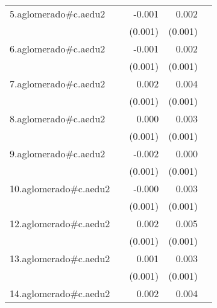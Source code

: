 {\begin{longtable}{l*{4}{D{.}{.}{-1}}}
\addlinespace
5.aglomerado#c.aedu2&                     &      -0.001         &       0.002\sym{**} &                     \\
            &                     &     (0.001)         &     (0.001)         &                     \\
\addlinespace
6.aglomerado#c.aedu2&                     &      -0.001         &       0.002\sym{*}  &                     \\
            &                     &     (0.001)         &     (0.001)         &                     \\
\addlinespace
7.aglomerado#c.aedu2&                     &       0.002         &       0.004\sym{***}&                     \\
            &                     &     (0.001)         &     (0.001)         &                     \\
\addlinespace
8.aglomerado#c.aedu2&                     &       0.000         &       0.003\sym{***}&                     \\
            &                     &     (0.001)         &     (0.001)         &                     \\
\addlinespace
9.aglomerado#c.aedu2&                     &      -0.002         &       0.000         &                     \\
            &                     &     (0.001)         &     (0.001)         &                     \\
\addlinespace
10.aglomerado#c.aedu2&                     &      -0.000         &       0.003\sym{**} &                     \\
            &                     &     (0.001)         &     (0.001)         &                     \\
\addlinespace
12.aglomerado#c.aedu2&                     &       0.002         &       0.005\sym{***}&                     \\
            &                     &     (0.001)         &     (0.001)         &                     \\
\addlinespace
13.aglomerado#c.aedu2&                     &       0.001         &       0.003\sym{***}&                     \\
            &                     &     (0.001)         &     (0.001)         &                     \\
\addlinespace
14.aglomerado#c.aedu2&                     &       0.002         &       0.004\sym{***}&                     \\

\end{longtable}}
